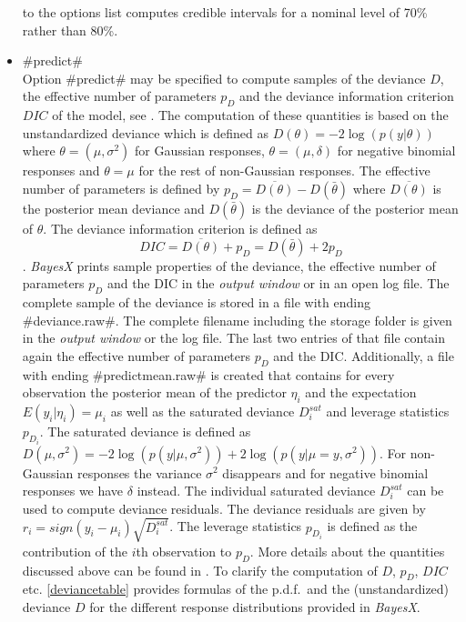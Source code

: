 \begin{itemize}
to the options list computes credible intervals for a nominal
level of 70\% rather than 80\%.

\item \label{predict} #predict# \\
  
   
Option #predict# may be specified to compute samples of the deviance
$D$, the effective number of parameters $p_D$ and the deviance
information criterion $DIC$ of the model, see .
The computation of these quantities is based on the
unstandardized deviance which is defined as $D(\theta) =
-2\log(p(y|\theta))$ where $\theta = (\mu,\sigma^2)$ for Gaussian
responses, $\theta = (\mu,\delta)$ for negative binomial responses
and $\theta = \mu$ for the rest of non-Gaussian responses. The
effective number of parameters is defined by $p_D =
\overline{D(\theta)} - D(\bar{\theta})$ where $\overline{D(\theta)}$
is the posterior mean deviance and $D(\bar{\theta})$ is the deviance
of the posterior mean of $\theta$. The deviance information
criterion is defined as
$$
DIC = \overline{D(\theta)} + p_D = D(\bar{\theta}) + 2 p_D
$$.
{\em
BayesX} prints sample properties of the deviance, the effective
number of parameters $p_D$ and the DIC in the {\em output window} or
in an open log file. The complete sample of the deviance is stored
in a file with ending #deviance.raw#. The complete filename
including the storage folder is given in the {\em output window} or
the log file. The last two entries of that file contain again the
effective number of parameters $p_D$ and the DIC. Additionally, a
file with ending #predictmean.raw# is created that contains for
every observation the posterior mean of the predictor $\eta_i$ and
the expectation $E(y_i | \eta_i) = \mu_i$ as well as the saturated
deviance $D^{sat}_i$ and leverage statistics $p_{D_i}$. The
saturated deviance is defined as $D(\mu,\sigma^2) =
-2\log(p(y|\mu,\sigma^2))+2\log(p(y|\mu=y,\sigma^2))$. For
non-Gaussian responses the variance $\sigma^2$ disappears and for
negative binomial responses we have $\delta$ instead. The individual
saturated deviance $D^{sat}_i$ can be used to compute deviance
residuals. The deviance residuals are given by $r_i =
sign(y_i-\mu_i) \sqrt{D^{sat}_i}$. The leverage statistics $p_{D_i}$
is defined as the contribution of the $i$th observation to $p_D$.
More details about the quantities discussed above can be found in
. To clarify the computation of $D$,
$p_D$, $DIC$ etc. \autoref{deviancetable} provides formulas of the
p.d.f.~and the (unstandardized) deviance $D$ for the different
response distributions provided in {\em BayesX}.
\end{itemize}

